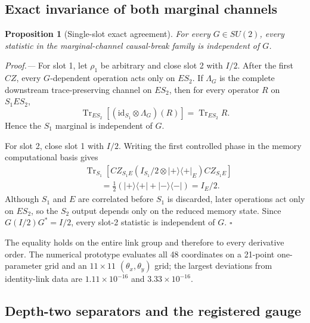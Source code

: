 \documentclass[aps,prl,reprint,superscriptaddress,nofootinbib]{revtex4-2}
\newcommand{\Tr}{\operatorname{Tr}}
\newcommand{\id}{\mathrm{id}}
\newtheorem{proposition}{Proposition}
\begin{document}
\subsection{Exact invariance of both marginal channels}

\begin{proposition}[Single-slot exact agreement]
\label{prop:single-slot-invariance}
For every $G\in SU(2)$, every statistic in the marginal-channel causal-break family is independent of $G$.
\end{proposition}

\emph{Proof.---}
For slot 1, let $\rho_1$ be arbitrary and close slot 2 with $I/2$.  After the first $CZ$, every $G$-dependent operation acts only on $ES_2$.  If $\Lambda_G$ is the complete downstream trace-preserving channel on $ES_2$, then for every operator $R$ on $S_1ES_2$,
\begin{equation}
 \Tr_{ES_2}\!\left[(\id_{S_1}\otimes\Lambda_G)(R)\right]
 =\Tr_{ES_2}R.
 \label{eq:no-signalling}
\end{equation}
Hence the $S_1$ marginal is independent of $G$.

For slot 2, close slot 1 with $I/2$.  Writing the first controlled phase in the memory computational basis gives
\begin{align}
 &\Tr_{S_1}\!\left[CZ_{S_1E}
 \left(I_{S_1}/2\otimes|+\rangle\!\langle+|_E\right)
 CZ_{S_1E}\right]\nonumber\\
 &\qquad=\frac12\left(|+\rangle\!\langle+|+|-\rangle\!\langle-|\right)=I_E/2.
 \label{eq:memory-pinning}
\end{align}
Although $S_1$ and $E$ are correlated before $S_1$ is discarded, later operations act only on $ES_2$, so the $S_2$ output depends only on the reduced memory state.  Since $G(I/2)G^*=I/2$, every slot-2 statistic is independent of $G$. \hfill$\square$

The equality holds on the entire link group and therefore to every derivative order.  The numerical prototype evaluates all 48 coordinates on a 21-point one-parameter grid and an $11\times11$ $(\theta_x,\theta_y)$ grid; the largest deviations from identity-link data are $1.11\times10^{-16}$ and $3.33\times10^{-16}$.

\subsection{Depth-two separators and the registered gauge}
\end{document}
